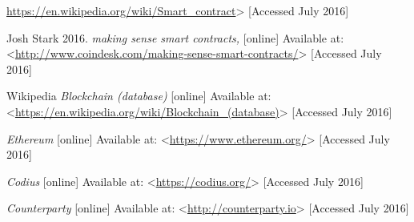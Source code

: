 \documentclass[12pt]{article}
\begin{document}
\url{https://en.wikipedia.org/wiki/Smart_contract}> [Accessed July 2016]
\newline
\newline

Josh Stark 2016. \textit{making sense smart contracts,} [online] Available at: <\url{http://www.coindesk.com/making-sense-smart-contracts/}> [Accessed July 2016]
\newline
\newline

Wikipedia \textit{Blockchain (database)} [online] Available at: <\url{https://en.wikipedia.org/wiki/Blockchain_(database)}> [Accessed July 2016]
\newline
\newline

 \textit{Ethereum} [online] Available at: <\url{https://www.ethereum.org/}> [Accessed July 2016]
\newline
\newline

 \textit{Codius} [online] Available at: <\url{https://codius.org/}> [Accessed July 2016]
\newline
\newline

 \textit{Counterparty} [online] Available at: <\url{http://counterparty.io}> [Accessed July 2016]
\newline
\newline
\end{document}
